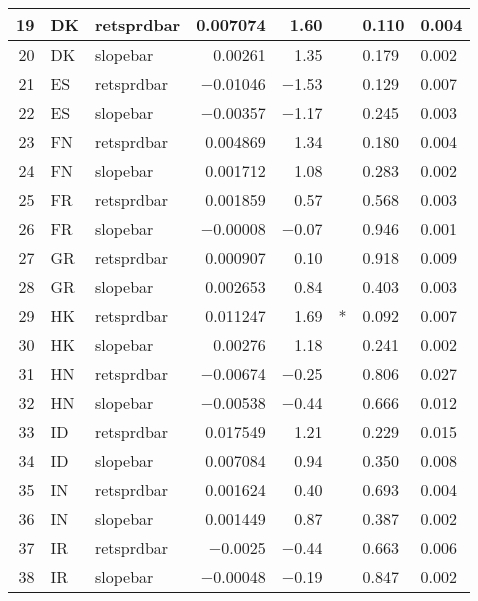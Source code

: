 \begin{longtable}{|r|l|l|r|r|l|l|l|}
   19 &    DK &    retsprdbar &    0.007074 &    1.60 &      &    0.110 &    0.004\\\hline
   20 &    DK &    slopebar &    0.00261 &    1.35 &      &    0.179 &    0.002\\\hline
   21 &    ES &    retsprdbar &    $-$0.01046 &    $-$1.53 &      &    0.129 &    0.007\\\hline
   22 &    ES &    slopebar &    $-$0.00357 &    $-$1.17 &      &    0.245 &    0.003\\\hline
   23 &    FN &    retsprdbar &    0.004869 &    1.34 &      &    0.180 &    0.004\\\hline
   24 &    FN &    slopebar &    0.001712 &    1.08 &      &    0.283 &    0.002\\\hline
   25 &    FR &    retsprdbar &    0.001859 &    0.57 &      &    0.568 &    0.003\\\hline
   26 &    FR &    slopebar &    $-$0.00008 &    $-$0.07 &      &    0.946 &    0.001\\\hline
   27 &    GR &    retsprdbar &    0.000907 &    0.10 &      &    0.918 &    0.009\\\hline
   28 &    GR &    slopebar &    0.002653 &    0.84 &      &    0.403 &    0.003\\\hline
   29 &    HK &    retsprdbar &    0.011247 &    1.69 &    * &    0.092 &    0.007\\\hline
   30 &    HK &    slopebar &    0.00276 &    1.18 &      &    0.241 &    0.002\\\hline
   31 &    HN &    retsprdbar &    $-$0.00674 &    $-$0.25 &      &    0.806 &    0.027\\\hline
   32 &    HN &    slopebar &    $-$0.00538 &    $-$0.44 &      &    0.666 &    0.012\\\hline
   33 &    ID &    retsprdbar &    0.017549 &    1.21 &      &    0.229 &    0.015\\\hline
   34 &    ID &    slopebar &    0.007084 &    0.94 &      &    0.350 &    0.008\\\hline
   35 &    IN &    retsprdbar &    0.001624 &    0.40 &      &    0.693 &    0.004\\\hline
   36 &    IN &    slopebar &    0.001449 &    0.87 &      &    0.387 &    0.002\\\hline
   37 &    IR &    retsprdbar &    $-$0.0025 &    $-$0.44 &      &    0.663 &    0.006\\\hline
   38 &    IR &    slopebar &    $-$0.00048 &    $-$0.19 &      &    0.847 &    0.002\\\hline

\end{longtable}
